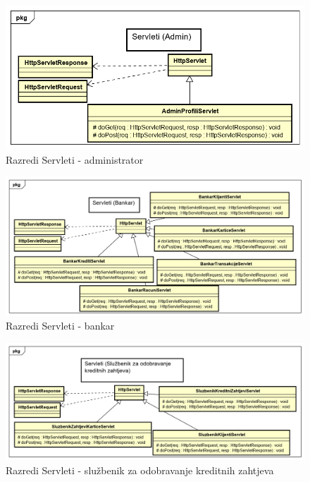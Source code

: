 			\begin{figure}[H]
				\includegraphics[scale=0.5]{Slike/Class Diagram9.PNG}
				\centering
				\caption{Razredi Servleti - administrator}
				\label{fig:dijagram}
			\end{figure}
		
			\begin{figure}[H]
				\includegraphics[scale=0.5]{Slike/Class Diagram10.PNG}
				\centering
				\caption{Razredi Servleti - bankar}
				\label{fig:dijagram}
			\end{figure}
		
			\begin{figure}[H]
				\includegraphics[scale=0.5]{Slike/Class Diagram11.PNG}
				\centering
				\caption{Razredi Servleti - službenik za odobravanje kreditnih zahtjeva}
				\label{fig:dijagram}
			\end{figure}
		

